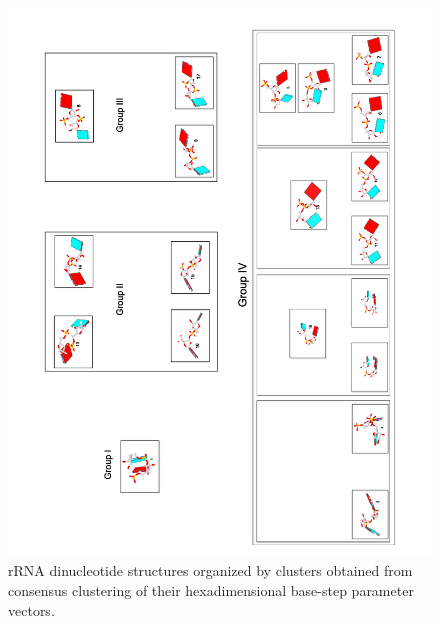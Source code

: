 \begin{figure}[htbp]
 \centering
\includegraphics[angle=0, scale=0.8]{Clustered.png}
 \caption{rRNA dinucleotide structures organized by clusters obtained from
consensus clustering of their hexadimensional base-step parameter vectors.}
 \label{fig:nonAclus}
\end{figure}

